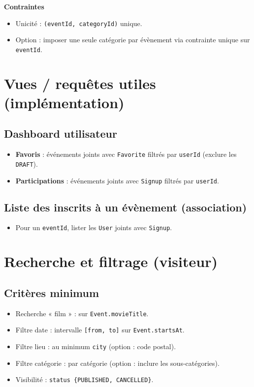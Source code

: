 \documentclass[11pt,a4paper]{article}
\begin{document}
\textbf{Contraintes}
\begin{itemize}
  \item Unicité : \texttt{(eventId, categoryId)} unique.
  \item Option : imposer une seule catégorie par évènement via contrainte unique sur \texttt{eventId}.
\end{itemize}

\section{Vues / requêtes utiles (implémentation)}
\subsection{Dashboard utilisateur}
\begin{itemize}
  \item \textbf{Favoris} : événements joints avec \texttt{Favorite} filtrés par \texttt{userId} (exclure les \texttt{DRAFT}).
  \item \textbf{Participations} : événements joints avec \texttt{Signup} filtrés par \texttt{userId}.
\end{itemize}

\subsection{Liste des inscrits à un évènement (association)}
\begin{itemize}
  \item Pour un \texttt{eventId}, lister les \texttt{User} joints avec \texttt{Signup}.
\end{itemize}

\section{Recherche et filtrage (visiteur)}
\subsection{Critères minimum}
\begin{itemize}
  \item Recherche « film » : sur \texttt{Event.movieTitle}.
  \item Filtre date : intervalle \texttt{[from, to]} sur \texttt{Event.startsAt}.
  \item Filtre lieu : au minimum \texttt{city} (option : code postal).
  \item Filtre catégorie : par catégorie (option : inclure les sous-catégories).
  \item Visibilité : \texttt{status \in \{PUBLISHED, CANCELLED\}}.
\end{itemize}
\end{document}
